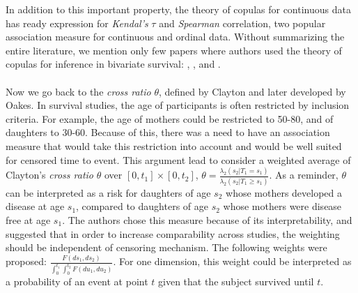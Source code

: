 \documentclass[]{article}
\begin{document}
In addition to this important property, the theory of copulas for continuous data has ready expression for \emph{Kendal's} $\tau$ and \emph{Spearman} correlation, two popular association measure for continuous and ordinal data. Without summarizing the entire literature, we mention only few papers where authors used the theory of copulas for inference in bivariate survival: \cite{shih1996tests}, \cite{shih1995inferences}, and \cite{zhang2008inference}.\\
~\\
Now we go back to the \emph{cross ratio} $\theta$, defined by Clayton and later developed by Oakes. In survival studies, the age of participants is often restricted by inclusion criteria. For example, the age of mothers could be restricted to 50-80, and of daughters to 30-60. Because of this, there was a need to have an association measure that would take this restriction into account and would be well suited for censored time to event. This argument lead \cite{fan2000dependence} to consider a weighted average of Clayton's \textit{cross ratio} $\theta$ over $[0,t_1] \times [0, t_2]$, $\theta = \frac{ \lambda_2(s_2|T_1=s_1)}{\lambda_2(s_2|T_1 \geq s_1)}$. As a reminder, $\theta$ can be interpreted as a risk for daughters of age $s_2$ whose mothers developed a disease at age $s_1$, compared to daughters of age $s_2$ whose mothers were disease free at age $s_1$. The authors chose this measure because of its interpretability, and suggested that in order to increase comparability across studies, the weighting should be independent of censoring mechanism. The following weights were proposed: $\frac{F(ds_1,ds_2)}{\int_0^{t_1}\int_0^{t_2} F(du_1, du_2)}$. For one dimension, this weight could be interpreted as a probability of an event at point $t$ given that the subject survived until $t$.\\
\end{document}
